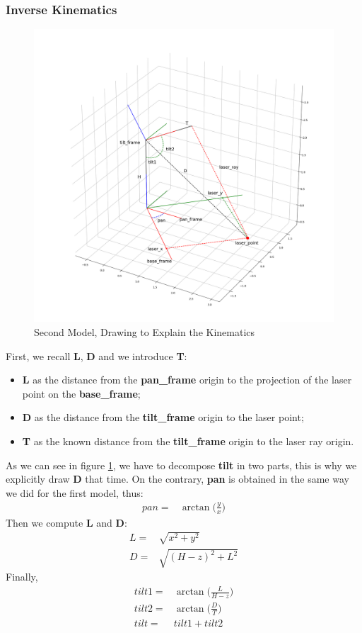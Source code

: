 \subsubsection{Inverse Kinematics}
\begin{figure}
	\centering
	\includegraphics[width=\textwidth]{img/model2XY.png}%
	\caption{Second Model, Drawing to Explain the Kinematics}
	\label{fig:secondModelPanTilt}
\end{figure}
First, we recall \textbf{L}, \textbf{D} and we introduce \textbf{T}:
\begin{itemize}
    \item \textbf{L} as the distance from the \textbf{pan\_frame} origin to the projection of the laser point on the \textbf{base\_frame};
    \item \textbf{D} as the distance from the \textbf{tilt\_frame} origin to the laser point;
    \item \textbf{T} as the known distance from the \textbf{tilt\_frame} origin to the laser ray origin.
\end{itemize}
As we can see in figure \ref{fig:secondModelPanTilt}, we have to decompose \textbf{tilt} in two parts, this is why we explicitly draw \textbf{D} that time. On the contrary, \textbf{pan} is obtained in the same way we did for the first model, thus:
\begin{align}
	pan=& \arctan\bigg(\frac{y}{x}\bigg)\label{eq:panik2}
\end{align}
Then we compute \textbf{L} and \textbf{D}:
\begin{align}
	L=& \sqrt{x^2+y^2}\\
	D=& \sqrt{(H-z)^2 + L^2}
\end{align}
Finally,
\begin{align}
	tilt1 =& \arctan\bigg(\frac{L}{H-z}\bigg)\\
	tilt2 =& \arctan\bigg(\frac{D}{T}\bigg)\\
	tilt =& tilt1 + tilt2
\end{align}
